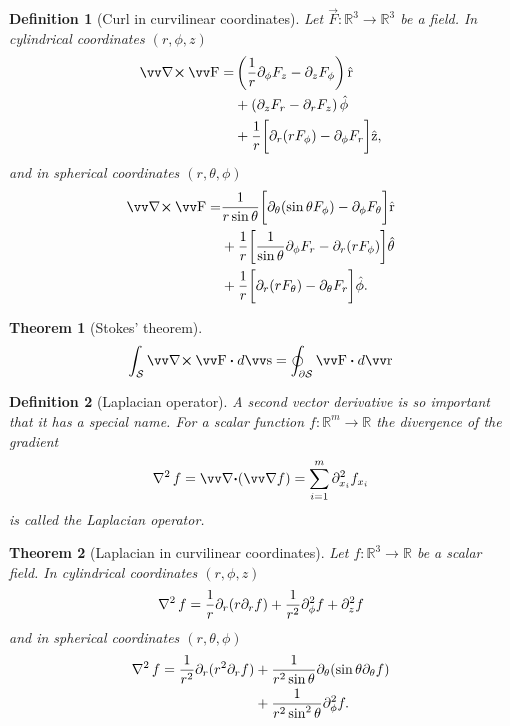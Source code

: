\documentclass[margin=normal]{tex/hsrzf}
\theoremstyle{elmagzf}
\newtheorem{theorem}{Theorem}
\newtheorem{definition}{Definition}
\begin{document}
\begin{definition}[Curl in curvilinear coordinates]
  Let \(\vec{F}: \mathbb{R}^3 \to \mathbb{R}^3\) be a field. In cylindrical
  coordinates \((r,\phi,z)\)
  \begin{align*}
    \curl \vec{F} =
      &\left(\frac{1}{r} \partial_\phi F_z - \partial_z F_\phi \right) \uvec{r} \\
      &+ \left(\partial_z F_r - \partial_r F_z \right) \uvec{\phi} \\
      &+ \frac{1}{r} \bigg[
        \partial_r (rF_\phi) - \partial_\phi F_r
        \bigg] \uvec{z},
  \end{align*}
  and in spherical coordinates \((r,\theta,\phi)\)
  \begin{align*}
      \curl \vec{F} =
        &\frac{1}{r \sin\theta} \bigg[
          \partial_\theta (\sin\theta F_\phi) - \partial_\phi F_\theta
        \bigg] \uvec{r} \\
        &+ \frac{1}{r} \bigg[
          \frac{1}{\sin\theta} \partial_\phi F_r - \partial_r (r F_\phi)
        \bigg] \uvec{\theta} \\
        &+ \frac{1}{r} \bigg[
          \partial_r (r F_\theta) - \partial_\theta F_r
        \bigg] \uvec{\phi} .
  \end{align*}
\end{definition}

\begin{theorem}[Stokes' theorem]
  \[
    \int_\mathcal{S} \curl \vec{F} \dotp d\vec{s}
    = \oint_{\partial\mathcal{S}} \vec{F} \dotp d\vec{r}
  \]
\end{theorem}

\begin{definition}[Laplacian operator]
  A second vector derivative is so important that it has a special name.  For a
  scalar function \(f: \mathbb{R}^m \to \mathbb{R}\) the divergence of the
  gradient
  \[
    \laplacian f = \div (\grad f) = \sum_{i=1}^m \partial_{x_i}^2 f_{x_i}
  \]
  is called the \emph{Laplacian operator}.
\end{definition}

\begin{theorem}[Laplacian in curvilinear coordinates]
  Let \(f: \mathbb{R}^3 \to \mathbb{R}\) be a scalar field. In cylindrical
  coordinates \((r,\phi,z)\)
  \[
    \operatorname{\nabla^2} f = \frac{1}{r} \partial_r (r \partial_r f)
      + \frac{1}{r^2} \partial_\phi^2 f
      + \partial_z^2 f
  \]
  and in spherical coordinates \((r,\theta,\phi)\)
  \begin{align*}
    \operatorname{\nabla^2} f = 
      \frac{1}{r^2} \partial_r ( r^2 \partial_r f)
      & + \frac{1}{r^2\sin\theta} \partial_\theta (\sin\theta \partial_\theta f) \\
      & + \frac{1}{r^2 \sin^2 \theta} \partial_\phi^2 f.
  \end{align*}
\end{theorem}
\end{document}
